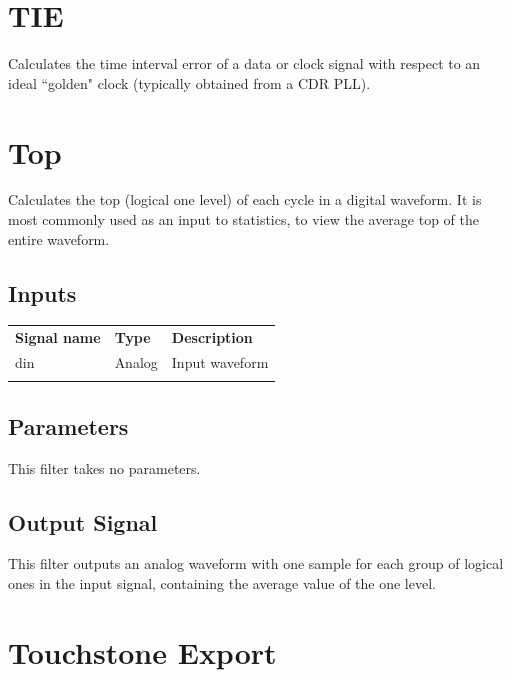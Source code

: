 \pagebreak
\section{TIE}

Calculates the time interval error of a data or clock signal with respect to an ideal ``golden" clock (typically
obtained from a CDR PLL).

\pagebreak
\section{Top}

Calculates the top (logical one level) of each cycle in a digital waveform. It is most commonly used as an input to
statistics, to view the average top of the entire waveform.

\subsection{Inputs}

\begin{tabularx}{16cm}{llX}
\thickhline
\textbf{Signal name} & \textbf{Type} & \textbf{Description} \\
\thickhline
din & Analog & Input waveform \\
\thickhline
\end{tabularx}

\subsection{Parameters}

This filter takes no parameters.

\subsection{Output Signal}

This filter outputs an analog waveform with one sample for each group of logical ones in the input signal, containing
the average value of the one level.

\pagebreak
\section{Touchstone Export}

